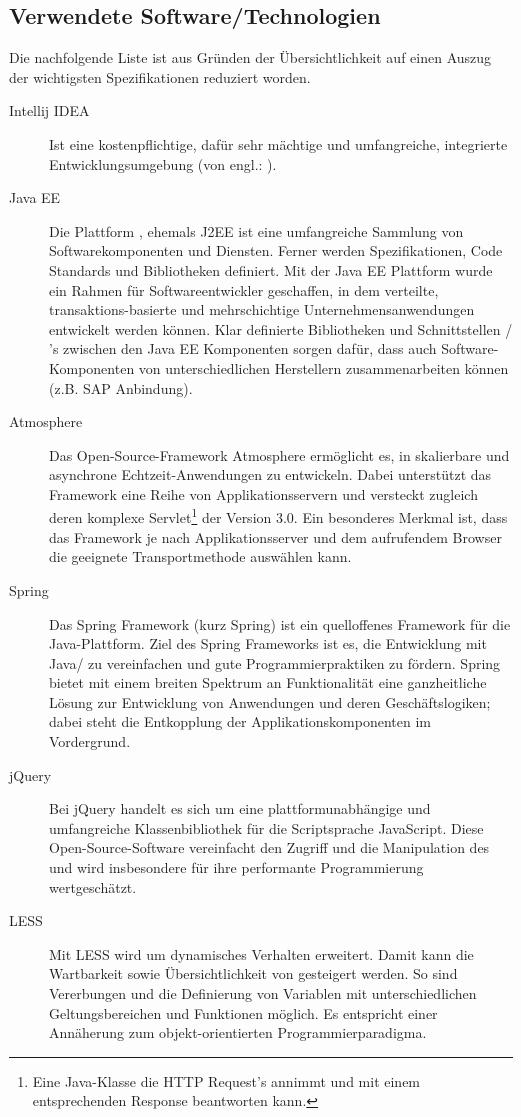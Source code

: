 \subsection{Verwendete Software/Technologien} 
\label{sub:Verwendete Software/Technologien}
Die nachfolgende Liste ist aus Gründen der Übersichtlichkeit auf einen Auszug der wichtigsten Spezifikationen reduziert worden.
\begin{description}
	\item [Intellij IDEA] Ist eine kostenpflichtige, dafür sehr mächtige und umfangreiche, integrierte
	Entwicklungsumgebung (von engl.: ).
	\item [Java EE]
	Die Plattform , ehemals J2EE ist eine umfangreiche Sammlung von Softwarekomponenten und Diensten. Ferner
	werden Spezifikationen, Code Standards und Bibliotheken definiert. Mit der Java EE Plattform wurde ein Rahmen für
	Softwareentwickler geschaffen, in dem verteilte, transaktions-basierte und mehrschichtige Unternehmensanwendungen entwickelt
	werden können. Klar definierte Bibliotheken und Schnittstellen / 's zwischen den Java EE Komponenten sorgen
	dafür, dass auch Software-Komponenten von unterschiedlichen Herstellern zusammenarbeiten können (z.B. SAP Anbindung).
	\citep{JavaEE}
	\item [Atmosphere]
	Das Open-Source-Framework Atmosphere ermöglicht es, in  skalierbare und asynchrone
	Echtzeit-Anwendungen zu entwickeln. Dabei unterstützt das Framework eine Reihe von Applikationsservern und versteckt zugleich
	deren komplexe Servlet\footnote{Eine Java-Klasse die HTTP Request's annimmt und mit einem entsprechenden Response beantworten
	kann.}  der Version 3.0. Ein besonderes Merkmal ist, dass das Framework je nach Applikationsserver und dem
	aufrufendem Browser die geeignete Transportmethode auswählen kann.
	\item [Spring]
	Das Spring Framework (kurz Spring) ist ein quelloffenes Framework für die Java-Plattform. Ziel des Spring Frameworks ist es, die
	Entwicklung mit Java/ zu vereinfachen und gute Programmierpraktiken zu fördern. Spring bietet mit einem
	breiten Spektrum an Funktionalität eine ganzheitliche Lösung zur Entwicklung von Anwendungen und deren Geschäftslogiken; dabei
	steht die Entkopplung der Applikationskomponenten im Vordergrund. \citep{Spring}
	\item [jQuery]
	Bei jQuery handelt es sich um eine plattformunabhängige und umfangreiche Klassenbibliothek für die Scriptsprache JavaScript.
	Diese Open-Source-Software vereinfacht den Zugriff und die Manipulation des  und wird
	insbesondere für ihre performante Programmierung wertgeschätzt. \citep[vgl.][]{jQuery}
	\item [LESS]
	Mit LESS wird  um dynamisches Verhalten erweitert. Damit kann die Wartbarkeit sowie Übersichtlichkeit 
	von  gesteigert werden. So sind \zB Vererbungen und die Definierung von Variablen mit unterschiedlichen
	Geltungsbereichen und Funktionen möglich. Es entspricht einer Annäherung zum objekt-orientierten Programmierparadigma.
\end{description}